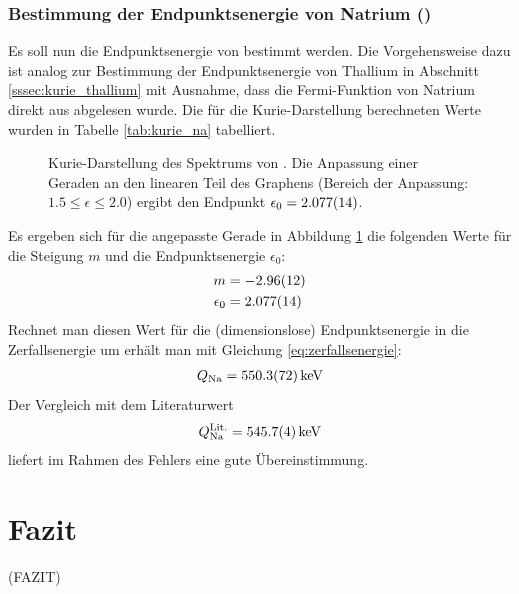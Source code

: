 \documentclass[11pt, a4paper]{article}
\numberwithin{equation}{section}
\begin{document}
\subsubsection{Bestimmung der Endpunktsenergie von Natrium ()}
Es soll nun die Endpunktsenergie von  bestimmt werden.
Die Vorgehensweise dazu ist analog zur Bestimmung der Endpunktsenergie von Thallium in Abschnitt \ref{sssec:kurie_thallium} mit Ausnahme, dass die Fermi-Funktion von Natrium direkt aus \cite{riezler} abgelesen wurde.
Die für die Kurie-Darstellung berechneten Werte wurden in Tabelle \ref{tab:kurie_na} tabelliert.
\begin{figure}[h]
	\centering
	
	\caption{Kurie-Darstellung des Spektrums von . Die Anpassung einer Geraden an den linearen Teil des Graphens (Bereich der Anpassung: $\num{1.5} \leq \epsilon \leq {2.0}$) ergibt den Endpunkt $\epsilon_0 = \num{2.077 +- 0.014}$.}
	\label{fig:natrium_kurie}
\end{figure}
Es ergeben sich für die angepasste Gerade in Abbildung \ref{fig:natrium_kurie} die folgenden Werte für die Steigung $m$ und die Endpunktsenergie $\epsilon_0$:
\begin{align*}
	m &= \num{-2.96+- 0.12} \\
	\epsilon_0 &= \num{2.077 +- 0.014}
\end{align*}
Rechnet man diesen Wert für die (dimensionslose) Endpunktsenergie in die Zerfallsenergie um erhält man mit Gleichung \ref{eq:zerfallsenergie}:
\begin{align*}
Q_\mathrm{Na} = \SI{550.3+-7.2}{\kilo\electronvolt}
\end{align*}
Der Vergleich mit dem Literaturwert \cite{na_literatur}
\begin{align*}
	Q^{\mathrm{Lit.}}_\mathrm{Na} = \SI{545.7 +- 0.4}{\kilo\electronvolt}
\end{align*}
liefert im Rahmen des Fehlers eine gute Übereinstimmung.

\section{Fazit}
(FAZIT)
\end{document}

